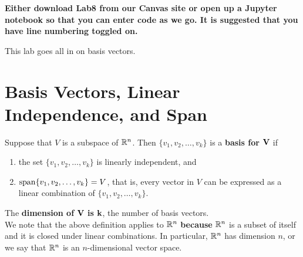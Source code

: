 \vspace*{1cm}

\textbf{Either download Lab8 from our Canvas site or open up a Jupyter notebook so that you can enter code as we go. It is suggested that you have line numbering toggled on.}  

\newpage

This lab goes all in on basis vectors. 

\section{Basis Vectors, Linear Independence, and Span}

\begin{tcolorbox}[sharp corners, colback=green!30, colframe=green!80!blue, title=\textbf{\Large Basis Vectors and Dimension}]
Suppose that $V$ is a subspace of $\mathbb R^n$. Then $\{ v_1, v_2, \ldots, v_k\}$ is a \textbf{basis for} ${\bf V}$ if
\begin{enumerate}
    \item the set $\{ v_1, v_2, \ldots, v_k\}$ is linearly independent, and 
    \item $\mathrm{span} \{ v_1,  v_2,\ldots, v_k \}=V$, that is, every vector in $V$ can be expressed as a linear combination of $\{ v_1, v_2, \ldots, v_k\}$.
\end{enumerate}

The \textbf{dimension of} ${\bf V}$ \textbf{is} ${\bf k}$, the number of basis vectors.\\

We note that the above definition applies to $\mathbb R^n$ \textbf{because} $\mathbb R^n$ is a subset of itself and it is closed under linear combinations. In particular, $\mathbb R^n$ has dimension $n$, or we say that $\mathbb R^n$ is an $n$-dimensional vector space.
\end{tcolorbox}

